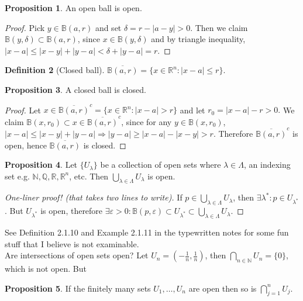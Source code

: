 \documentclass[a4paper]{article}
\theoremstyle{definition}
\newtheorem{defn}{Definition}[subsection]
\newtheorem{prop}[defn]{Proposition}
\begin{document}
\begin{prop}
An open ball is open.
\end{prop}
\begin{proof}
Pick $y\in \mathbb B (a,r)$ and set $\delta =r-|a-y|>0$. Then we claim $\mathbb B (y,\delta ) \subset \mathbb B (a,r)$, since $x\in \mathbb B(y,\delta )$ and by triangle inequality, $|x-a|\leq |x-y|+|y-a|<\delta +|y-a| =r$.
\end{proof}

\begin{defn}[Closed ball]
$\overline{\mathbb B (a,r)}=\{x\in \mathbb R^n : |x-a|\leq r\}$.
\end{defn}
\begin{prop}
A closed ball is closed.
\end{prop}
\begin{proof}
Let $x\in \overline{\mathbb B(a,r)}^c=\{x\in \mathbb R^n:|x-a|>r\}$ and let $r_0=|x-a|-r>0.$ We claim $\mathbb B (x,r_0) \subset x\in \overline{\mathbb B(a,r)}^c$, since for any $y\in \mathbb B (x,r_0)$, $|x-a|\leq |x-y|+|y-a| \Rightarrow |y-a|\geq |x-a|-|x-y|>r .$ Therefore $\overline{\mathbb B(a,r)}^c$ is open, hence $\overline{\mathbb B(a,r)}$ is closed.
\end{proof}

\begin{prop}
Let $\{U_\lambda\}$ be a collection of open sets where $\lambda \in \Lambda $, an indexing set e.g. $\mathbb N,\mathbb Q,\mathbb R,\mathbb R^n$, etc. Then $\displaystyle \bigcup_{\lambda \in \Lambda} U_\lambda$ is open.
\end{prop}
\begin{proof}[One-liner proof! (that takes two lines to write)]
If $p\in \displaystyle \bigcup_{\lambda \in \Lambda} U_\lambda$, then $\exists \lambda^\ast : p\in U_{\lambda^\ast}$. But $U_{\lambda^\ast}$ is open, therefore $\exists \varepsilon >0 : \mathbb B(p,\varepsilon)\subset U_{\lambda^\ast} \subset \displaystyle \bigcup_{\lambda \in \Lambda} U_\lambda$.
\end{proof}

See Definition 2.1.10 and Example 2.1.11 in the typewritten notes for some fun stuff that I believe is not examinable. \\

Are intersections of open sets open? Let $U_n=\left(-\frac1n,\frac1n \right)$, then $\displaystyle \bigcap_{n\in \mathbb N} U_n=\{0\}$, which is not open. But
\begin{prop}
If the finitely many sets $U_1,\ldots,U_n$ are open then so is $\displaystyle \bigcap_{j=1}^n U_j$.
\end{prop}
\end{document}
